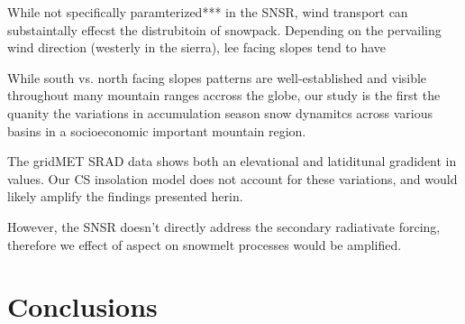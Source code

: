 While not specifically paramterized*** in the SNSR, wind transport can substaintally effecst the distrubitoin of snowpack. Depending on the pervailing wind direction (westerly in the sierra), lee facing slopes tend to have 

While south vs. north facing slopes patterns are well-established and visible throughout many mountain ranges accross the globe, our study is the first the quanity the variations in accumulation season snow dynamitcs across various basins in a socioeconomic important mountain region. 

The gridMET SRAD data shows both an elevational and latiditunal gradident in values. Our CS insolation model does not account for these variations, and would likely amplify the findings presented herin.

However, the SNSR doesn’t directly address the secondary radiativate forcing, therefore we effect of aspect on snowmelt processes would be amplified.

\hypertarget{ch2-conclusions}{\section{Conclusions}\label{ch2-conclusions}}



